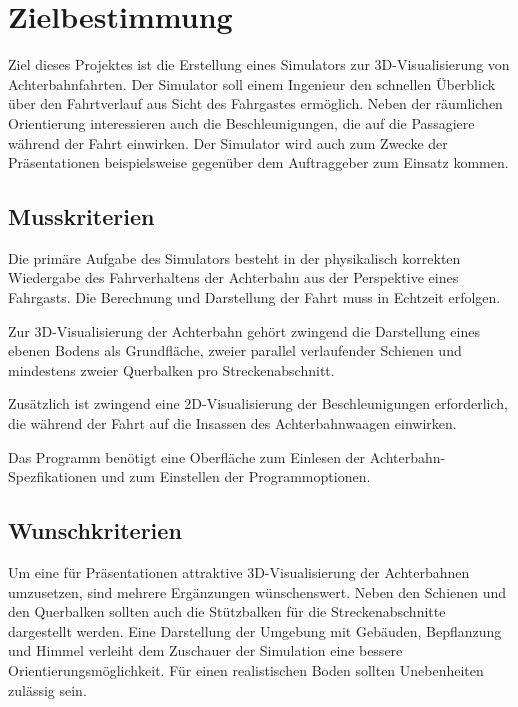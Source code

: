 
\chapter{Zielbestimmung}
Ziel dieses Projektes ist die Erstellung eines Simulators zur 3D-Visualisierung von Achterbahnfahrten. Der Simulator soll einem Ingenieur den schnellen Überblick über den Fahrtverlauf aus Sicht des Fahrgastes ermöglich. Neben der räumlichen Orientierung interessieren auch die Beschleunigungen, die auf die Passagiere während der Fahrt einwirken. Der Simulator wird auch zum Zwecke der Präsentationen beispielsweise gegenüber dem Auftraggeber zum Einsatz kommen.

\section{Musskriterien}
Die primäre Aufgabe des Simulators besteht in der physikalisch korrekten Wiedergabe des Fahrverhaltens der Achterbahn aus der Perspektive eines Fahrgasts. Die Berechnung und Darstellung der Fahrt muss in Echtzeit erfolgen.

Zur 3D-Visualisierung der Achterbahn gehört zwingend die Darstellung eines ebenen Bodens als Grundfläche, zweier parallel verlaufender Schienen und mindestens zweier Querbalken pro Streckenabschnitt.

Zusätzlich ist zwingend eine 2D-Visualisierung der Beschleunigungen erforderlich, die während der Fahrt auf die Insassen des Achterbahnwaagen einwirken.

Das Programm benötigt eine Oberfläche zum Einlesen der Achterbahn-Spezfikationen und zum Einstellen der Programmoptionen.

\section{Wunschkriterien}

Um eine für Präsentationen attraktive 3D-Visualisierung der Achterbahnen umzusetzen, sind mehrere Ergänzungen wünschenswert. Neben den Schienen und den Querbalken sollten auch die Stützbalken für die Streckenabschnitte dargestellt werden. Eine Darstellung der Umgebung mit Gebäuden, Bepflanzung und Himmel verleiht dem Zuschauer der Simulation eine bessere Orientierungsmöglichkeit. Für einen realistischen Boden sollten Unebenheiten zulässig sein.

